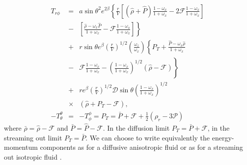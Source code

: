 \documentclass[twocolumn,superscriptaddress]{revtex4}
\begin{document}
\begin{eqnarray}
T_{r\phi}&=&a\sin\theta^2 e^{2\beta}\left\{ \frac{r}{V}\left[(\hat\rho+\hat P)\frac{1-\omega_x}{1+\omega_x}-2\mathcal{F}\frac{1-\omega_x}{1+\omega_x}\right]\right.
\nonumber\\
&-&\left.\left[\frac{\hat\rho-\omega_x\hat P}{1+\omega_x}-\mathcal{F}\frac{1-\omega_x}{1+\omega_x}\right]\right\}\nonumber\\
&+&r\sin\theta e^{\beta}\left(\frac{r}{V}\right)^{1/2}\left(\frac{\omega_z}{\omega_x}\right)\left\{ P_T + \frac{\hat P-\omega_x\hat\rho}{1+\omega_x}\right.\nonumber\\
&-&\left.\mathcal{F}\frac{1-\omega_x}{1+\omega_x}-\left(\frac{1-\omega_x}{1+\omega_x}\right)^{1/2}{(\hat\rho-\mathcal{F})}\right\}\nonumber\\
&+&r e^{\beta}\left(\frac{r}{V}\right)^{1/2}\mathcal{D}\sin\theta \left(\frac{1-\omega_x}{1+\omega_x}\right)^{1/2} \nonumber\\
&\times&(\hat\rho+P_T-\mathcal{F}),\\
-T_\theta^\theta&=&-T_\phi^\phi=P_T =\bar P +\mathcal{F}+\frac{1}{2}(\rho_r-3\mathcal{P})
\end{eqnarray}
where $\bar\rho=\hat\rho-\mathcal{F}$ and $\bar P=\hat P - \mathcal{F}$.  In the diffusion limit $P_T=\bar P + \mathcal{F}$, in the streaming out limit $P_T=\bar P$. 
{We can choose to write equivalently the energy-momentum components as for a diffusive anisotropic fluid or as for a streaming out isotropic fluid \cite{b10}.}
%
%
\end{document}
